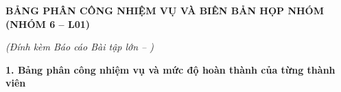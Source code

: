 \clearpage
{}
{}

\begin{center}
    {\fontsize{14}{17}\selectfont\bfseries BẢNG PHÂN CÔNG NHIỆM VỤ VÀ BIÊN BẢN HỌP NHÓM (NHÓM 6 -- L01)\par}
    \vspace{0.12cm}
    {\fontsize{11}{14}\selectfont\itshape (Đính kèm Báo cáo Bài tập lớn -- \TenMonHoc)\par}
\end{center}

\vspace{0.15cm}
\noindent\textbf{1. Bảng phân công nhiệm vụ và mức độ hoàn thành của từng thành viên}

